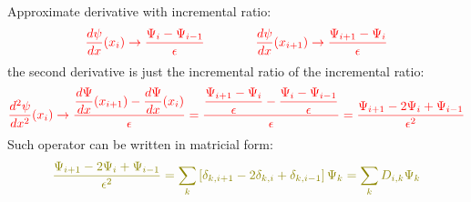\documentclass{article}
\begin{document}
\vspace{3mm} \noindent
Approximate derivative with incremental ratio:
\begin{equation}
    \textcolor{red}{
\frac{d\psi}{dx}(x_i) \rightarrow \frac{\Psi_i - \Psi_{i-1}}{\epsilon}
\qquad\qquad
\frac{d\psi}{dx}(x_{i+1}) \rightarrow \frac{\Psi_{i+1} - \Psi_i}{\epsilon}
}
\end{equation}
the second derivative is just the incremental ratio of the incremental ratio:
\begin{equation}
    \textcolor{red}{
\frac{d^2 \psi}{dx^2}(x_i) 
\rightarrow \frac{\dfrac{d\Psi}{dx}(x_{i+1}) - \dfrac{d\Psi}{dx}(x_i)}{\epsilon}
= \frac{\dfrac{\Psi_{i+1} - \Psi_i}{\epsilon} - \dfrac{\Psi_i - \Psi_{i-1}}{\epsilon}}{\epsilon}
= \frac{\Psi_{i+1} - 2\Psi_i + \Psi_{i-1}}{\epsilon^2}
}
\end{equation}
Such operator can be written in matricial form:
\begin{equation}
    \textcolor{olive}{\frac{\Psi_{i+1} - 2\Psi_i + \Psi_{i-1}}{\epsilon^2}
= \sum_k \left[ \delta_{k,i+1} - 2\delta_{k,i} + \delta_{k,i-1} \right] \Psi_k
= \sum_k D_{i,k} \Psi_k }
\end{equation}

\newpage
\end{document}

